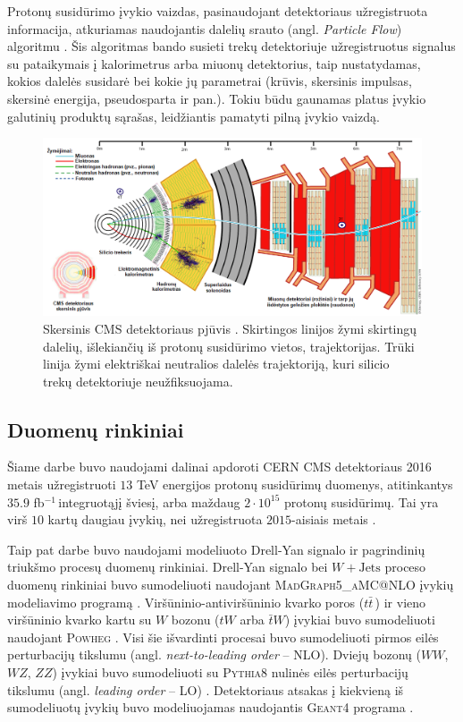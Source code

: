 \documentclass[a4paper, 12pt, twoside]{article}
\newcommand{\WJets}{W\! +\!\mathrm{Jets}}
\newcommand{\invfb}{fb$^{-1}\,$}
\begin{document}
Protonų susidūrimo įvykio vaizdas, pasinaudojant detektoriaus užregistruota informacija, atkuriamas naudojantis
dalelių srauto (angl. \textit{Particle Flow}) algoritmu \cite{ParticleFlow}.
Šis algoritmas bando susieti trekų detektoriuje užregistruotus signalus su pataikymais į kalorimetrus arba miuonų
detektorius, taip nustatydamas, kokios dalelės susidarė bei kokie jų parametrai (krūvis, skersinis impulsas,
skersinė energija, pseudosparta ir pan.).
Tokiu būdu gaunamas platus įvykio galutinių produktų sąrašas, leidžiantis pamatyti pilną įvykio vaizdą.

\begin{figure}
	\includegraphics[width=\textwidth]{CMSslice_LT.png}
	\caption{\label{fig:CMSslice}Skersinis CMS detektoriaus pjūvis \cite{CMSslice}.
	Skirtingos linijos žymi skirtingų dalelių, išlekiančių iš protonų susidūrimo vietos, trajektorijas.
	Trūki linija žymi elektriškai neutralios dalelės trajektoriją, kuri silicio trekų detektoriuje
	neužfiksuojama.}
\end{figure}

\vspace{-0.2cm}
\subsection{Duomenų rinkiniai}
\vspace{-0.2cm}

Šiame darbe buvo naudojami dalinai apdoroti CERN CMS detektoriaus 2016 metais užregistruoti $13$ TeV
energijos protonų susidūrimų duomenys, atitinkantys $35.9$ \invfb integruotąjį šviesį, arba maždaug
$2 \cdot 10^{15}$ protonų susidūrimų.
Tai yra virš $10$ kartų daugiau įvykių, nei užregistruota $2015$-aisiais metais \cite{DY2018}.

Taip pat darbe buvo naudojami modeliuoto Drell-Yan signalo ir pagrindinių triukšmo procesų duomenų rinkiniai.
Drell-Yan signalo bei $\WJets$ proceso duomenų rinkiniai buvo sumodeliuoti naudojant
\textsc{MadGraph5\_aMC@NLO} įvykių modeliavimo programą \cite{MG_aMCatNLO}.
Viršūninio-antiviršūninio kvarko poros ($t\bar{t}\,$) ir vieno viršūninio kvarko kartu su $W$ bozonu ($tW$ arba
$\bar{t}W$) įvykiai buvo sumodeliuoti naudojant \textsc{Powheg} \cite{powheg_ttbar, powheg_tW}.
Visi šie išvardinti procesai buvo sumodeliuoti pirmos eilės perturbacijų tikslumu (angl.
\textit{next-to-leading order} -- NLO).
Dviejų bozonų ($WW$, $WZ$, $ZZ$) įvykiai buvo sumodeliuoti su \textsc{Pythia8} nulinės eilės perturbacijų tikslumu
(angl. \textit{leading order} -- LO) \cite{pythia82}.
Detektoriaus atsakas į kiekvieną iš sumodeliuotų įvykių buvo modeliuojamas naudojantis \textsc{Geant4} programa
\cite{geant4}.
\end{document}
